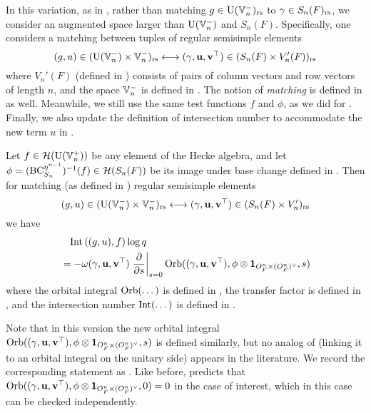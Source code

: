 In this variation, as in \cite{ref:liuFJ},
rather than matching $g \in \operatorname{U}(\mathbb V_n^-)_{\mathrm{rs}}$ to $\gamma \in S_n(F)_{\mathrm{rs}}$,
we consider an augmented space larger than $\operatorname{U}(\mathbb V_n^-)$ and $S_n(F)$.
Specifically, one considers a matching between tuples of regular semisimple elements
\[ (g, u) \in (\operatorname{U}(\mathbb V_n^-) \times \mathbb V_n^-)_{\mathrm{rs}}
  \longleftrightarrow (\gamma, \mathbf u, \mathbf v^\top) \in (S_n(F) \times V_n'(F))_{\mathrm{rs}} \]
where $V_n'(F)$ (defined in )
consists of pairs of column vectors and row vectors of length $n$,
and the space $\mathbb V_n^-$ is defined in .
The notion of \emph{matching} is defined in  as well.
Meanwhile, we still use the same test functions $f$ and $\phi$,
as we did for \cite[Conjecture 6.2.1]{ref:AFLspherical}.
Finally, we also update the definition of intersection number
to accommodate the new term $u$ in .

\begin{conjecture}
  Let $f \in \mathcal H(\operatorname{U}(\mathbb V_n^+))$ be any element of the Hecke algebra,
  and let $\phi = (\operatorname{BC}_{S_n}^{\eta^{n-1}})^{-1}(f) \in \mathcal H(S_n(F))$ be its image
  under base change defined in .
  Then for matching (as defined in ) regular semisimple elements
  \[ (g, u) \in (\operatorname{U}(\mathbb V_n^-) \times \mathbb V_n^-)_{\mathrm{rs}} \longleftrightarrow
    {(\gamma, \mathbf u, \mathbf v^\top)} \in (S_n(F) \times V_n')_{\mathrm{rs}} \]
  we have
  \begin{equation}
    \begin{aligned}
      &\phantom= \Int\left( (g,u), f \right) \log q \\
      &= -\omega\guv \left. \pdv{}{s} \right\rvert_{s=0}
      \Orb(\guv, \phi \otimes \oneV, s)
    \end{aligned}
  \end{equation}
  where the orbital integral $\operatorname{Orb}(\dots)$ is defined in ,
  the transfer factor is defined in ,
  and the intersection number $\operatorname{Int}(\dots)$ is defined in .
  \label{conj:semi_lie_spherical}
\end{conjecture}
Note that in this version the new orbital integral $\operatorname{Orb}({(\gamma, \mathbf u, \mathbf v^\top)}, \phi \otimes \mathbf{1}_{O_F^n \times (O_F^n)^\vee}, s)$
is defined similarly, but no analog of 
(linking it to an orbital integral on the unitary side) appears in the literature.
We record the corresponding statement as .
Like before, 
predicts that $\operatorname{Orb}({(\gamma, \mathbf u, \mathbf v^\top)}, \phi \otimes \mathbf{1}_{O_F^n \times (O_F^n)^\vee}, 0) = 0$ in the case of interest,
which in this case can be checked independently.

